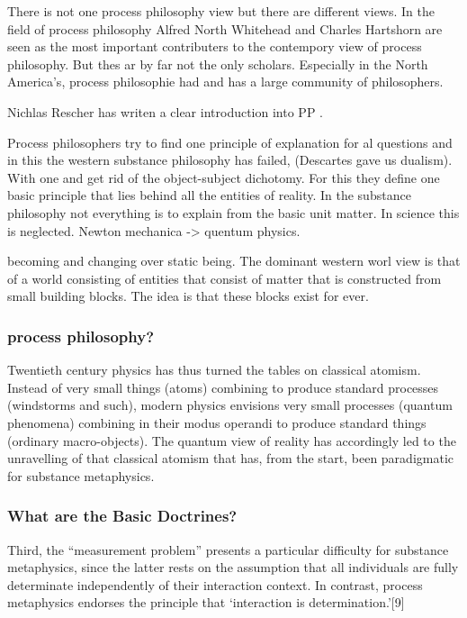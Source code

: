 There is not one process philosophy view but there are different views.
In the field of process philosophy Alfred North Whitehead and Charles Hartshorn are seen as the most important contributers to the contempory view of process philosophy. 
But thes ar by far not the only scholars. Especially in the North America's, process philosophie had and has a large community of philosophers. 

Nichlas Rescher has writen a clear introduction into PP \cite{rescher1996process}.

Process philosophers try to find one principle of explanation for al questions and in this the western  substance philosophy has failed, (Descartes gave us dualism).
With one and get rid of the object-subject dichotomy. For this they define one basic principle that lies behind all the entities of reality. 
In the substance philosophy not everything is to explain from the basic unit matter. In science this is neglected.
Newton mechanica -> quentum physics.

becoming and changing over static being. The dominant western worl view is that of a world consisting of entities that consist of matter that is constructed from small building blocks. The idea is that these blocks exist for ever.

\subsubsection{process philosophy?}
Twentieth century physics has thus turned the tables on classical atomism. Instead of very small things (atoms) combining to produce standard processes (windstorms and such), modern physics envisions very small processes (quantum phenomena) combining in their modus operandi to produce standard things (ordinary macro-objects). The quantum view of reality has accordingly led to the unravelling of that classical atomism that has, from the start, been paradigmatic for substance metaphysics.
\subsubsection{What are the Basic Doctrines?}
Third, the “measurement problem” presents a particular difficulty for substance metaphysics, since the latter rests on the assumption that all individuals are fully determinate independently of their interaction context. In contrast, process metaphysics endorses the principle that ‘interaction is determination.’[9]

